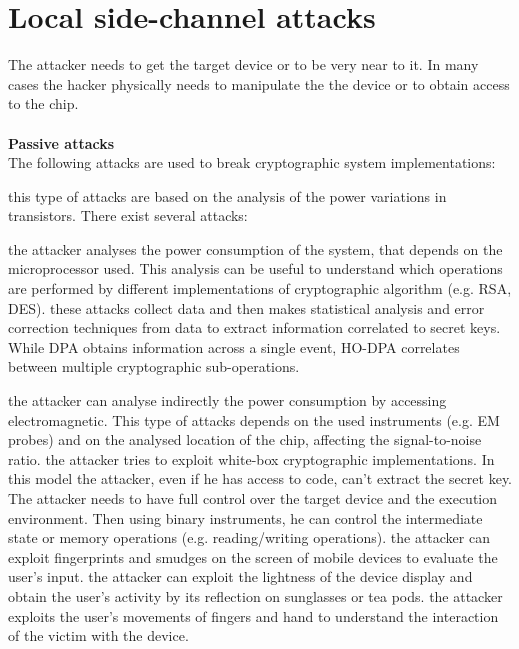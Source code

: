 \section{Local side-channel attacks}
The attacker needs to get the target device or to be very near to it. In many cases the hacker physically needs to manipulate the the device or to obtain access to the chip.\\\\
\textbf{Passive attacks}\\
The following attacks are used to break cryptographic system implementations:
\begin{itemize}
{this type of attacks are based on the analysis of the power variations in transistors. There exist several attacks\cite{intro_DPA}:
\begin{itemize}
{the attacker analyses the power consumption of the system, that depends on the microprocessor used. This analysis can be useful to understand which operations are performed by different implementations of cryptographic algorithm (e.g. RSA, DES).}
{these attacks collect data and then makes statistical analysis and error correction techniques from data to extract information correlated to secret keys.}
{While DPA obtains information across a single event, HO-DPA correlates between multiple cryptographic sub-operations.}
\end{itemize}}
{the attacker can analyse indirectly the power consumption by accessing electromagnetic. This type of attacks depends on the used instruments (e.g. EM probes) and on the analysed location of the chip, affecting the signal-to-noise ratio.}
{the attacker tries to exploit white-box cryptographic implementations. In this model the attacker, even if he has access to code, can't extract the secret key. The attacker needs to have full control over the target device and the execution environment. Then using binary instruments, he can control the intermediate state or memory operations (e.g. reading/writing operations)\cite{side_DCA}.}
{the attacker can exploit fingerprints and smudges on the screen of mobile devices to evaluate the user's input.}
{the attacker can exploit the lightness of the device display and obtain the user's activity by its reflection on sunglasses or tea pods.}
{the attacker exploits the user's movements of fingers and hand to understand the interaction of the victim with the device.}
\end{itemize}
